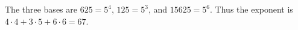 The three bases are $625=5^4$, $125=5^3$, and $15625=5^6$. Thus the exponent is $4\cdot4+3\cdot5+6\cdot6=\boxed{67}$.
